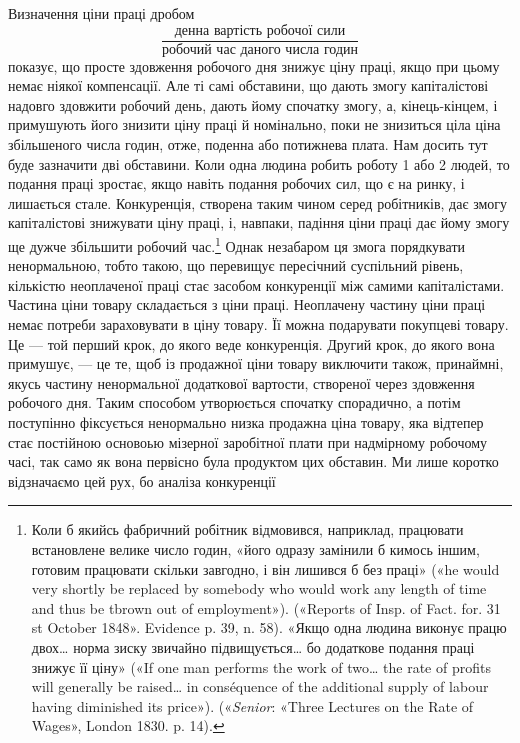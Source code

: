 Визначення ціни праці дробом\[
\frac{\text{денна вартість робочої сили}}{\text{робочий час даного числа годин}}
\]
\noindent{}показує, що просте здовження робочого дня знижує ціну праці,
якщо при цьому немає ніякої компенсації. Але ті самі обставини,
що дають змогу капіталістові надовго здовжити робочий день,
дають йому спочатку змогу, а, кінець-кінцем, і примушують
його знизити ціну праці й номінально, поки не знизиться ціла ціна
збільшеного числа годин, отже, поденна або потижнева плата.
Нам досить тут буде зазначити дві обставини. Коли одна людина
робить роботу 1 або 2 людей, то подання праці зростає, якщо
навіть подання робочих сил, що є на ринку, і лишається стале.
Конкуренція, створена таким чином серед робітників, дає змогу
капіталістові знижувати ціну праці, і, навпаки, падіння ціни
праці дає йому змогу ще дужче збільшити робочий час.\footnote{
Коли б якийсь фабричний робітник відмовився, наприклад, працювати
встановлене велике число годин, «його одразу замінили б кимось
іншим, готовим працювати скільки завгодно, і він лишився б без праці»
(«he would very shortly be replaced by somebody who would work any
length of time and thus be tbrown out of employment»). («Reports of Insp.
of Fact. for. 31 st October 1848». Evidence p. 39, n. 58). «Якщо одна людина
виконує працю двох\dots{} норма зиску звичайно підвищується\dots{} бо додаткове
подання праці знижує її ціну» («If one man performs the work of
two\dots{} the rate of profits will generally be raised\dots{} in conséquence of the
additional supply of labour having diminished its price»). («\emph{Senior}:
«Three Lectures on the Rate of Wages», London 1830. p. 14).
} Однак
незабаром ця змога порядкувати ненормальною, тобто такою,
що перевищує пересічний суспільний рівень, кількістю неоплаченої
праці стає засобом конкуренції між самими капіталістами.
Частина ціни товару складається з ціни праці. Неоплачену частину
ціни праці немає потреби зараховувати в ціну товару.
Її можна подарувати покупцеві товару. Це — той перший крок,
до якого веде конкуренція. Другий крок, до якого вона примушує,
— це те, щоб із продажної ціни товару виключити також,
принаймні, якусь частину ненормальної додаткової вартости, створеної
через здовження робочого дня. Таким способом утворюється
спочатку спорадично, а потім поступінно фіксується ненормально
низка продажна ціна товару, яка відтепер стає постійною
основоью мізерної заробітної плати при надмірному
робочому часі, так само як вона первісно була продуктом цих
обставин. Ми лише коротко відзначаємо цей рух, бо аналіза конкуренції
